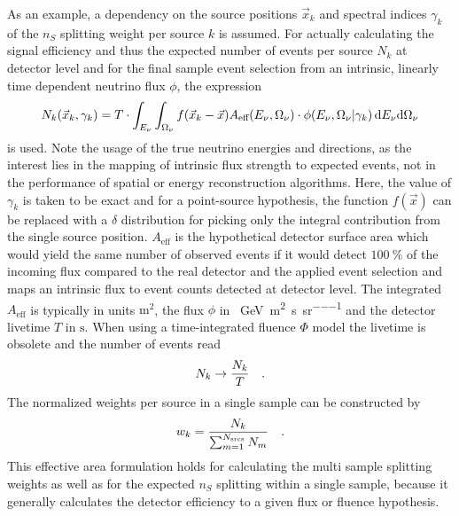 As an example, a dependency on the source positions $\vec{x}_k$ and spectral indices $\gamma_k$ of the $n_S$ splitting weight per source $k$ is assumed.
For actually calculating the signal efficiency and thus the expected number of events per source $N_k$ at detector level and for the final sample event selection from an intrinsic, linearly time dependent neutrino flux $\phi$, the expression
\begin{equation}
  N_k(\vec{x}_k, \gamma_k)
  = T \cdot \int_{E_\nu} \int_{\Omega_\nu} f(\vec{x}_k - \vec{x})
      A_\text{eff}(E_\nu,\Omega_\nu) \cdot
      \phi(E_\nu,\Omega_\nu | \gamma_k) \,\mathrm{d}E_\nu\mathrm{d}\Omega_\nu
\end{equation}
is used.
Note the usage of the true neutrino energies and directions, as the interest lies in the mapping of intrinsic flux strength to expected events, not in the performance of spatial or energy reconstruction algorithms.
Here, the value of $\gamma_k$ is taken to be exact and for a point-source hypothesis, the function $f(\vec{x})$ can be replaced with a $\delta$ distribution for picking only the integral contribution from the single source position.
$A_\text{eff}$ is the hypothetical detector surface area which would yield the same number of observed events if it would detect $\SI{100}{\percent}$ of the incoming flux compared to the real detector and the applied event selection and maps an intrinsic flux to event counts detected at detector level.
The integrated $A_\text{eff}$ is typically in units $\si{\m\squared}$, the flux $\phi$ in \si{\per\GeV\per\m\squared\per\second\per\steradian} and the detector livetime $T$ in $\si{\second}$.
When using a time-integrated fluence $\Phi$ model the livetime is obsolete and the number of events read
\begin{equation}
  N_k \rightarrow \frac{N_k}{T}
  \quad\text{.}
\end{equation}
The normalized weights per source in a single sample can be constructed by
\begin{equation}
  w_k = \frac{N_k}{\sum_{m=1}^{N_\text{srcs}} N_m}
  \quad\text{.}
\end{equation}
This effective area formulation holds for calculating the multi sample splitting weights as well as for the expected $n_S$ splitting within a single sample, because it generally calculates the detector efficiency to a given flux or fluence hypothesis.

